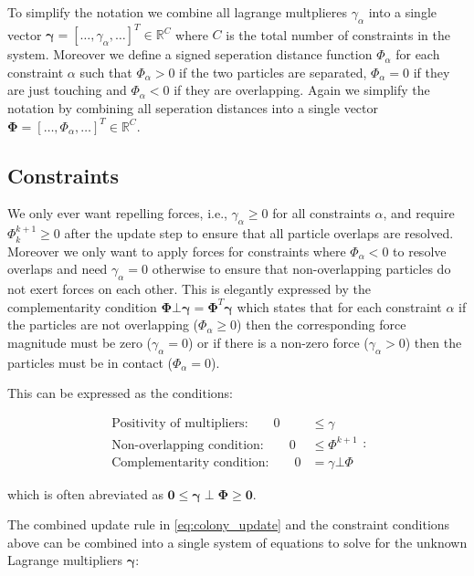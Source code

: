 \documentclass[conference]{IEEEtran}
\begin{document}
To simplify the notation we combine all lagrange multplieres $\gamma_\alpha$ into a single vector $\mathbf{\gamma} = [\dots, \gamma_\alpha, \dots]^T \in \mathbb{R}^{C}$ where $C$ is the total number of constraints in the system. Moreover we define a signed seperation distance function $\Phi_{\alpha}$ for each constraint $\alpha$ such that $\Phi_{\alpha} > 0$ if the two particles are separated, $\Phi_{\alpha} = 0$ if they are just touching and $\Phi_{\alpha} < 0$ if they are overlapping. Again we simplify the notation by combining all seperation distances into a single vector $\mathbf{\Phi} = [\dots, \Phi_\alpha, \dots]^T \in \mathbb{R}^{C}$.


\subsection{Constraints}

We only ever want repelling forces, i.e., $\gamma_\alpha \geq 0$ for all constraints $\alpha$, and require $\Phi_{k}^{k+1} \geq 0$ after the update step to ensure that all particle overlaps are resolved. Moreover we only want to apply forces for constraints where $\Phi_{\alpha} < 0$ to resolve overlaps and need $\gamma_\alpha = 0$ otherwise to ensure that non-overlapping particles do not exert forces on each other. This is elegantly expressed by the complementarity condition $\mathbf{\Phi} \bot \mathbf{\gamma} = \mathbf{\Phi}^T \mathbf{\gamma}$ which states that for each constraint $\alpha$ if the particles are not overlapping ($\Phi_\alpha \geq 0$) then the corresponding force magnitude must be zero ($\gamma_\alpha = 0$) or if there is a non-zero force ($\gamma_\alpha > 0$) then the particles must be in contact ($\Phi_\alpha = 0$).

This can be expressed as the conditions:

$$
    \begin{align}
        \text{Positivity of multipliers:} \qquad  0 & \leq \gamma        \\
        \text{Non-overlapping condition:} \qquad  0 & \leq \Phi^{k+1}    \\
        \text{Complementarity condition:} \qquad  0 & = \gamma \bot \Phi
    \end{align}:
$$

which is often abreviated as $\mathbf{0} \leq \mathbf{\gamma} \perp \mathbf{\Phi} \geq \mathbf{0}$.


The combined update rule in \autoref{eq:colony_update} and the constraint conditions above can be combined into a single system of equations to solve for the unknown Lagrange multipliers $\mathbf{\gamma}$:
\end{document}
